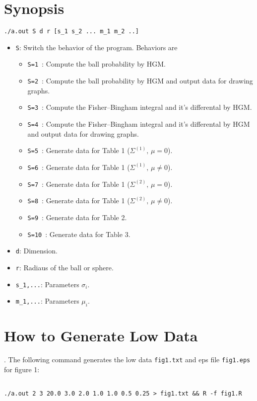 \documentclass{article}
\begin{document}
\section{Synopsis}
\begin{verbatim}
./a.out S d r [s_1 s_2 ... m_1 m_2 ..]
\end{verbatim}
\begin{itemize}
\item \verb+S+\/: Switch the behavior of the program. Behaviors are
  \begin{itemize}
    \item \verb+S=1+\ : %
    Compute the ball probability by HGM.
    \item \verb+S=2+\ : %
    Compute the ball probability by HGM and output data for drawing graphs.
    \item \verb+S=3+\ : %
    Compute the Fisher--Bingham integral and it's differental by HGM.
    \item \verb+S=4+\ : %
    Compute the Fisher--Bingham integral and it's differental by HGM
    and output data for drawing graphs.
    \item \verb+S=5+\ : %
    Generate data for Table 1 ($\Sigma^{(1)},\,\mu=0$).
    \item \verb+S=6+\ : %
    Generate data for Table 1 ($\Sigma^{(1)},\,\mu\neq 0$).
    \item \verb+S=7+\ : %
    Generate data for Table 1 ($\Sigma^{(2)},\,\mu=0$).
    \item \verb+S=8+\ : %
    Generate data for Table 1 ($\Sigma^{(2)},\,\mu\neq 0$).
    \item \verb+S=9+\ : %
    Generate data for Table 2.
    \item \verb+S=10+\ : %
    Generate data for Table 3.
  \end{itemize}
\item \verb+d+\/: Dimension.
\item \verb+r+\/: Radiaus of the ball or sphere.
\item \verb+s_1,...+\/: Parameters $\sigma_i$.
\item \verb+m_1,...+\/: Parameters $\mu_i$.
\end{itemize}


\section{How to Generate Low Data}
\/.
The following command generates the low data {\tt fig1.txt}
and eps file {\tt fig1.eps} for figure 1:
\begin{lstlisting}[style=BashInputStyle]

./a.out 2 3 20.0 3.0 2.0 1.0 1.0 0.5 0.25 > fig1.txt && R -f fig1.R
\end{lstlisting}
\end{document}
